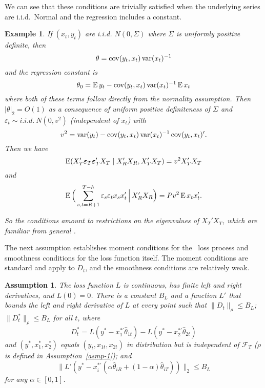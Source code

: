 \documentclass[11pt]{article}
\newcommand{\e}{\varepsilon}
\newtheorem{asmp}{Assumption}
\newtheorem{example}{Example}
\begin{document}
We can see that these conditions are trivially satisfied when the
underlying series are i.i.d.\ Normal and the regression includes a
constant.
\begin{example}
  If $(x_{t}, y_t)$ are i.i.d. $N(0, \Sigma)$ where $\Sigma$ is
  uniformly positive definite, then
  \begin{equation*}
    \theta = \operatorname{cov}(y_t, x_t) \operatorname{var}(x_t)^{-1}
  \end{equation*}
  and the regression constant is
  \begin{equation*}
    \theta_0 = \operatorname{E} y_t - \operatorname{cov}(y_t, x_t) \operatorname{var}(x_t)^{-1} \operatorname{E} x_t
  \end{equation*}
  where both of these terms follow directly from the normality
  assumption.  Then $|\theta|_2 = O(1)$ as a consequence of uniform
  positive definiteness of $\Sigma$ and $\varepsilon_t \sim i.i.d.\
  N(0, v^2)$ (independent of $x_t$) with
  \begin{equation*}
    v^2 = \operatorname{var}(y_t) - \operatorname{cov}(y_t, x_t) \operatorname{var}(x_t)^{-1} \operatorname{cov}(y_t, x_t)'.
  \end{equation*}
  Then we have
  \begin{equation*}
    \operatorname{E}(X_{T}'\boldsymbol{\varepsilon}_{T}\boldsymbol{\varepsilon}_{T}'X_T \mid X_{R}'X_{R}, X_{T}'X_{T})
    = v^2 X_{T}'X_{T}
  \end{equation*}
  and
  \begin{equation*}
    \E\Big( \sum_{s,t=R+1}^{T-h} \e_s \e_t x_s x_t'
    \,\Big|\, X_{R}'X_{R} \Big) = P v^2 \E x_t x_t'.
  \end{equation*}

  So the conditions amount to restrictions on the eigenvalues of
  $X_T'X_T$, which are familiar from general \ols.
\end{example}

The next assumption establishes moment conditions for the \oos\ loss
process and smoothness conditions for the loss function itself. The
moment conditions are standard and apply to $D_t$, and the smoothness
conditions are relatively weak.

\begin{asmp}\label{asmp-3}
  The loss function $L$ is continuous, has finite left and right
  derivatives, and $L(0) = 0$.  There is a constant $B_L$ and a
  function $L'$ that bounds the left and right derivative of $L$ at
  every point such that $\|D_t\|_\rho \leq B_L$; $\|D_t^*\|_\rho \leq
  B_L$ for all $t$, where
  \begin{equation*}
    D_t^* = L(y^* - x_1^{*\prime}\hat\theta_{1t})
    - L(y^* - x_2^{*\prime}\hat\theta_{2t})
  \end{equation*}
  and $(y^*, x_1^*, x_2^*)$ equals $(y_t, x_{1t}, x_{2t})$ in
  distribution but is independent of $\mathcal{F}_T$ ($\rho$ is defined
  in Assumption~\ref{asmp-1}); and
  \begin{equation*}
    \| L'(y^* - x_{i}^{*\prime}
    (\alpha \hat{\theta}_{iR} + (1-\alpha) \hat{\theta}_{iT})) \|_2
    \leq B_L
  \end{equation*}
  for any $\alpha \in [0,1]$.
\end{asmp}
\end{document}

